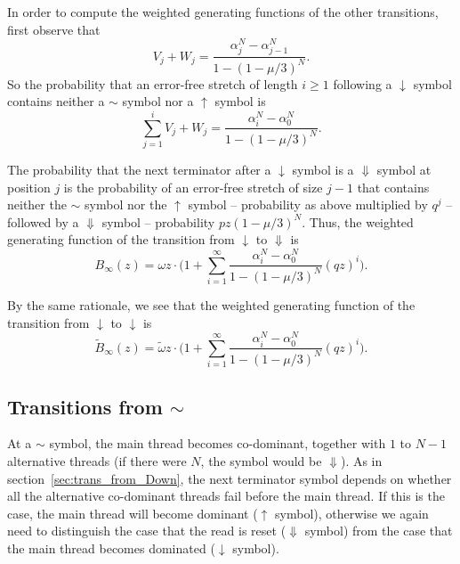 \documentclass{article}
\begin{document}
In order to compute the weighted generating functions of the other
transitions, first observe that
\begin{equation}
V_j+W_j = \frac{\alpha_j^N - \alpha_{j-1}^N}{1-(1-\mu/3)^N}.
\end{equation}
So the probability that an error-free stretch of length $i \geq 1$
following a $\downarrow$ symbol contains neither a $\sim$ symbol nor a
$\uparrow$ symbol is
\begin{equation}
\sum_{j=1}^i V_j+W_j = \frac{\alpha_i^N -
\alpha_0^N}{1-(1-\mu/3)^N}.
\end{equation}

The probability that the next terminator after a $\downarrow$ symbol is a
$\Downarrow$ symbol at position $j$ is the probability of an error-free
stretch of size $j-1$ that contains neither the $\sim$ symbol nor the
$\uparrow$ symbol -- probability as above multiplied by $q^j$ -- followed
by a $\Downarrow$ symbol -- probability $pz(1-\mu/3)^N$. Thus, the
weighted generating function of the transition from $\downarrow$ to
$\Downarrow$ is
\begin{equation}
B_\infty(z) = \omega z \cdot \Big(1 + \sum_{i=1}^\infty
\frac{\alpha_i^N - \alpha_0^N}{1-(1-\mu/3)^N} (qz)^i \Big).
\end{equation}

By the same rationale, we see that the weighted generating function of the
transition from $\downarrow$ to $\downarrow$ is
\begin{equation}
\tilde{B}_\infty(z) = \tilde{\omega} z \cdot \Big(1 + \sum_{i=1}^\infty
\frac{\alpha_i^N - \alpha_0^N}{1-(1-\mu/3)^N} (qz)^i \Big).
\end{equation}

\subsection{Transitions from $\sim$}
\label{sec:trans_from_sim}

At a $\sim$ symbol, the main thread becomes co-dominant, together with $1$
to $N-1$ alternative threads (if there were $N$, the symbol would be
$\Downarrow$). As in section~\ref{sec:trans_from_Down}, the next
terminator symbol depends on whether all the alternative co-dominant
threads fail before the main thread. If this is the case, the main thread
will become dominant ($\uparrow$ symbol), otherwise we again need to
distinguish the case that the read is reset ($\Downarrow$ symbol) from the
case that the main thread becomes dominated ($\downarrow$ symbol).
\end{document}
